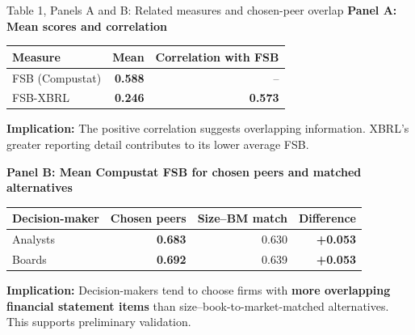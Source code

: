 \documentclass[10pt,aspectratio=169]{beamer}
\newcommand{\hi}[1]{{\color{Teal}\textbf{#1}}}
\newcommand{\imp}[1]{\par\vspace{2mm}\textbf{\color{Stern}Implication:} #1\par}
\begin{document}
\begin{frame}[label=table-1]{Table 1, Panels A and B: Related measures and chosen-peer overlap}
\small
\textbf{Panel A: Mean scores and correlation}
\vspace{1mm}
\begin{tabularx}{\textwidth}{Yrr}
\toprule
\textbf{Measure} & \textbf{Mean} & \textbf{Correlation with FSB}\\
\midrule
FSB (Compustat) & \hi{0.588} & --\\
FSB-XBRL & \hi{0.246} & \hi{0.573}\\
\bottomrule
\end{tabularx}
\imp{The positive correlation suggests overlapping information. XBRL's greater reporting detail contributes to its lower average FSB.}

\vspace{2mm}
\textbf{Panel B: Mean Compustat FSB for chosen peers and matched alternatives}
\vspace{1mm}
\begin{tabularx}{\textwidth}{Yrrr}
\toprule
\textbf{Decision-maker} & \textbf{Chosen peers} & \textbf{Size--BM match} & \textbf{Difference}\\
\midrule
Analysts & \hi{0.683} & 0.630 & \hi{+0.053}\\
Boards & \hi{0.692} & 0.639 & \hi{+0.053}\\
\bottomrule
\end{tabularx}
\imp{Decision-makers tend to choose firms with \hi{more overlapping financial statement items} than size--book-to-market-matched alternatives. This supports preliminary validation.}

\end{frame}
\end{document}
